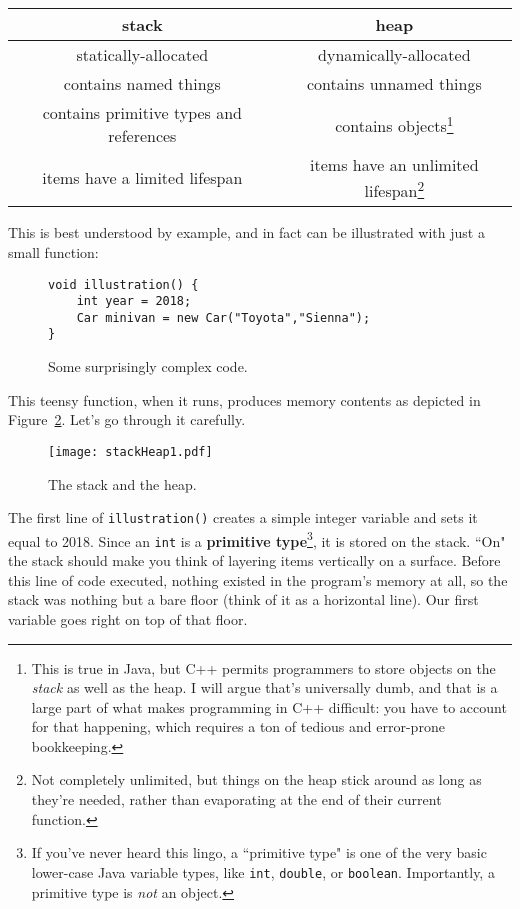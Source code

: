 \vspace{.2in}
\begin{tabular}{c|c}
\textbf{stack} & \textbf{heap} \\
\hline
statically-allocated & dynamically-allocated \\
contains named things & contains unnamed things \\
contains primitive types and references & contains objects\footnote{This is
true in Java, but C++ permits programmers to store objects on the
\textit{stack} as well as the heap. I will argue that's universally dumb, and
that is a large part of what makes programming in C++ difficult: you have to
account for that happening, which requires a ton of tedious and error-prone
bookkeeping.} \\
items have a limited lifespan & items have an unlimited lifespan\footnote{Not
completely unlimited, but things on the heap stick around as long as they're
needed, rather than evaporating at the end of their current function.} \\
\end{tabular}
\vspace{.2in}

This is best understood by example, and in fact can be illustrated with just a
small function:

\begin{figure}[ht]
\begin{Verbatim}[fontsize=\small,samepage=true,frame=single]
void illustration() {
    int year = 2018;
    Car minivan = new Car("Toyota","Sienna");
}
\end{Verbatim}
\vspace{-.3in}
\caption{Some surprisingly complex code.}
\label{fig:firstCode}
\end{figure}

This teensy function, when it runs, produces memory contents as depicted in
Figure~\ref{fig:stackHeap1}. Let's go through it carefully.

\begin{figure}[ht]   %
\centering
\texttt{[image: stackHeap1.pdf]}
\caption{The stack and the heap.}
\label{fig:stackHeap1}
\end{figure}

The first line of \texttt{illustration()} creates a simple integer variable
and sets it equal to 2018. Since an \texttt{int} is a \textbf{primitive
type}\footnote{If you've never heard this lingo, a ``primitive type" is one of
the very basic lower-case Java variable types, like \texttt{int},
\texttt{double}, or \texttt{boolean}. Importantly, a primitive type is
\textit{not} an object.}, it is stored on the stack. ``On" the stack should
make you think of layering items vertically on a surface. Before this line of
code executed, nothing existed in the program's memory at all, so the stack
was nothing but a bare floor (think of it as a horizontal line). Our first
variable goes right on top of that floor.

